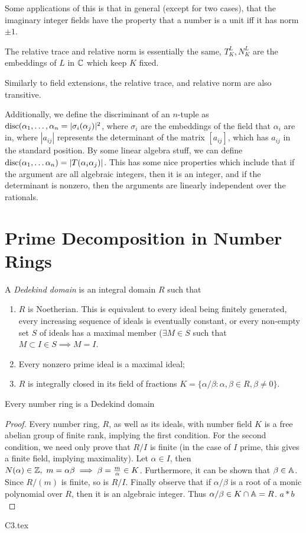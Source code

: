 \documentclass{article}
\begin{document}
Some applications of this is that in general (except for two cases), that the imaginary integer fields have the property that a number is a unit iff it has norm \(\pm1\).

\begin{definition}
The relative trace and relative norm is essentially the same, \(T^L_K, N^L_K\) are the embeddings of \(L\) in \(\CC\) which keep \(K\) fixed.
\end{definition}
Similarly to field extensions, the relative trace, and relative norm are also transitive.

Additionally, we define the discriminant of an \(n\)-tuple as \(\disc(\alpha_1, \dots, \alpha_n = |\sigma_i(\alpha_j)|^2\), where \(\sigma_i\) are the embeddings of the field that \(\alpha_i\) are in, where \(|a_{ij}|\) represents the determinant of the matrix \([a_{ij}]\), which has \(a_{ij}\) in the standard position. By some linear algebra stuff, we can define \(\disc(\alpha_1, \dots \alpha_n)=|T(\alpha_i\alpha_j)|\). 
This has some nice properties which include that if the argument are all algebraic integers, then it is an integer, and if the determinant is nonzero, then the arguments are linearly independent over the rationals.

\section{Prime Decomposition in Number Rings}
\begin{definition}
A \textit{Dedekind domain} is an integral domain \(R\) such that
\begin{enumerate}[label=(\alph*)]
    \item \(R\) is Noetherian. This is equivalent to every ideal being finitely generated, every increasing sequence of ideals is eventually constant, or every non-empty set \(S\) of ideals has a maximal member (\(\exists M \in S\) such that \(M \subset I \in S \implies M=I\).
    \item Every nonzero prime ideal is a maximal ideal;
    \item \(R\) is integrally closed in its field of fractions \(K = \{ \alpha/\beta : \alpha, \beta \in R, \beta \neq 0 \}\).
\end{enumerate}
\end{definition}
\begin{theorem}
Every number ring is a Dedekind domain
\end{theorem}
\begin{proof}
Every number ring, \(R\), as well as its ideals, with number field \(K\) is a free abelian group of finite rank, implying the first condition. For the second condition, we need only prove that \(R/I\) is finite (in the case of \(I\) prime, this gives a finite field, implying maximality). Let \(\alpha \in I\), then \(N(\alpha) \in \ZZ, \ m=\alpha\beta \implies \beta = \frac{m}{\alpha} \in K\). Furthermore, it can be shown that \(\beta \in \AA\). Since \(R/(m)\) is finite, so is \(R/I\). Finally observe that if \(\alpha/\beta\) is a root of a monic polynomial over \(R\), then it is an algebraic integer. Thus \(\alpha/\beta \in K \cap \AA = R\). \( a \ast b\) 

\end{proof}
{C3.tex}
\end{document}
